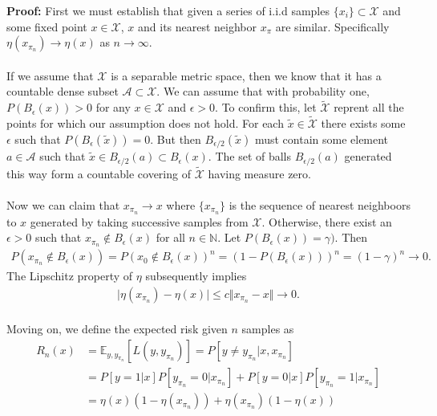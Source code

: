 \documentclass[11pt,letter]{article}
\begin{document}
\begin{enumerate}
    \textbf{Proof:} First we must establish that given a series of i.i.d samples $\{x_i\} \subset \mathcal X$ and some fixed point $x \in \mathcal X$, $x$ and its nearest neighbor $x_{\pi}$ are similar.
    Specifically $\eta(x_{\pi_n}) \to \eta(x)$ as $n \to \infty$.
    \\ \\
    If we assume that $\mathcal X$ is a separable metric space, then we know that it has a countable dense subset $\mathcal A \subset \mathcal X$. 
    We can assume that with probability one, $P(B_{\epsilon}(x)) > 0$ for any $x \in \mathcal X$ and $\epsilon > 0$.
    To confirm this, let $\tilde{\mathcal X}$ reprent all the points for which our assumption does not hold.
    For each $\tilde x \in \tilde{\mathcal X} $ there exists some $\epsilon$ such that $P(B_{\epsilon}(\tilde x)) = 0$. But then $B_{\epsilon/2}(\tilde x)$ must contain some element $a \in \mathcal A$ such that $\tilde x \in B_{\epsilon/2}(a) \subset B_{\epsilon}(x)$. The set of balls $B_{\epsilon/2}(a)$ generated this way form a countable covering of $\tilde{\mathcal X}$ having measure zero.
    \\ \\
    Now we can claim that $x_{\pi_n} \to x$ where $\{x_{\pi_n}\}$ is the sequence of nearest neighboors to $x$ generated by taking successive samples from $\mathcal X$. Otherwise, there exist an $\epsilon > 0$ such that $x_{\pi_n} \notin B_{\epsilon}(x)$ for all $n \in \mathbb N$. Let $P(B_{\epsilon}(x)) = \gamma)$. Then
    \begin{align*}
        P(x_{\pi_n} \notin B_{\epsilon}(x)) = P(x_0 \notin B_{\epsilon}(x))^n = (1 - P(B_{\epsilon}(x)))^n = (1 - \gamma)^n \to 0.
    \end{align*}
    The Lipschitz property of $\eta$ subsequently implies
    \begin{align*}
        \vert \eta(x_{\pi_n}) - \eta(x) \vert \le c \Vert x_{\pi_n} - x \Vert \to 0.
    \end{align*}
    \\
    Moving on, we define the expected risk given $n$ samples as
    \begin{align*}
        R_n(x) & = \mathbb E_{y,y_{\pi_n}}[L(y,y_{\pi_n})] = P[y \ne y_{\pi_n} \vert x, x_{\pi_n}] \\
        & = P[y = 1 \vert x]P[y_{\pi_n} = 0 \vert x_{\pi_n}] + P[y = 0 \vert x]P[y_{\pi_n} = 1 \vert x_{\pi_n}] \\
        & = \eta(x)(1 - \eta(x_{\pi_n})) + \eta(x_{\pi_n})(1 - \eta(x))
    \end{align*}

\end{enumerate}
\end{document}
